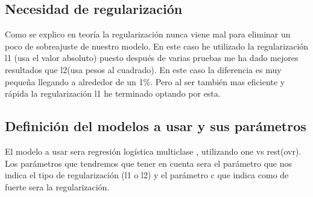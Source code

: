 \documentclass[titlepage]{article}
\begin{document}
\subsection{Necesidad de regularización}
Como se explico en teoría la regularización nunca viene mal para eliminar un poco de sobreajuste de nuestro modelo. En este caso he utilizado la regularización l1 (usa el valor absoluto) puesto después de varias pruebas me ha dado mejores resultados que l2(usa pesos al cuadrado). En este caso la diferencia es muy pequeña llegando a alrededor de un 1\%. Pero al ser también mas eficiente y rápida la regularización l1 he terminado optando por esta.

\subsection{Definición del modelos a usar y sus parámetros}
El modelo a usar sera regresión logística multiclase , utilizando one vs rest(ovr). Los parámetros que tendremos que tener en cuenta sera el parámetro que nos indica el tipo de regularización (l1 o l2) y el parámetro c que indica como de fuerte sera la regularización.
\end{document}

